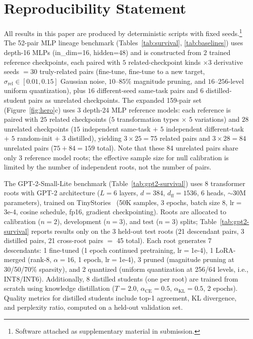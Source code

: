 \section{Reproducibility Statement}\label{app:reproducibility}

All results in this paper are produced by deterministic scripts with fixed seeds.\footnote{Software attached as supplementary material in submission.} The 52-pair MLP lineage benchmark (Tables~\ref{tab:survival}, \ref{tab:baselines}) uses depth-16 MLPs (in\_dim=16, hidden=48) and is constructed from $2$ trained reference checkpoints, each paired with $5$ related-checkpoint kinds $\times 3$ derivative seeds $=30$ truly-related pairs (fine-tune, fine-tune to a new target, $\sigma_{\text{rel}} \in [0.01,0.15]$ Gaussian noise, $10$--$85\%$ magnitude pruning, and $16$--$256$-level uniform quantization), plus $16$ different-seed same-task pairs and $6$ distilled-student pairs as unrelated checkpoints. The expanded 159-pair set (Figure~\ref{fig:hero}c) uses $3$ depth-24 MLP reference models: each reference is paired with $25$ related checkpoints ($5$ transformation types $\times$ $5$ variations) and $28$ unrelated checkpoints ($15$ independent same-task $+$ $5$ independent different-task $+$ $5$ random-init $+$ $3$ distilled), yielding $3 \times 25 = 75$ related pairs and $3 \times 28 = 84$ unrelated pairs ($75 + 84 = 159$ total). Note that these 84 unrelated pairs share only 3 reference model roots; the effective sample size for null calibration is limited by the number of independent roots, not the number of pairs.

The GPT-2-Small-Lite benchmark (Table~\ref{tab:gpt2-survival}) uses 8 transformer roots with GPT-2 architecture ($L{=}6$ layers, $d{=}384$, $d_{\mathrm{ff}}{=}1536$, 6 heads, ${\sim}$30M parameters), trained on TinyStories~\citep{eldan2023tinystories} (50K samples, 3 epochs, batch size 8, lr$=$3e-4, cosine schedule, fp16, gradient checkpointing). Roots are allocated to calibration ($n{=}2$), development ($n{=}3$), and test ($n{=}3$) splits; Table~\ref{tab:gpt2-survival} reports results only on the 3 held-out test roots (21 descendant pairs, 3 distilled pairs, 21 cross-root pairs $=$ 45 total). Each root generates 7 descendants: 1 fine-tuned (1 epoch continued pretraining, lr$=$1e-4), 1 LoRA-merged (rank-8, $\alpha{=}16$, 1 epoch, lr$=$1e-4), 3 pruned (magnitude pruning at 30/50/70\% sparsity), and 2 quantized (uniform quantization at 256/64 levels, i.e., INT8/INT6). Additionally, 8 distilled students (one per root) are trained from scratch using knowledge distillation ($T{=}2.0$, $\alpha_{\mathrm{CE}}{=}0.5$, $\alpha_{\mathrm{KL}}{=}0.5$, 2 epochs). Quality metrics for distilled students include top-1 agreement, KL divergence, and perplexity ratio, computed on a held-out validation set.

